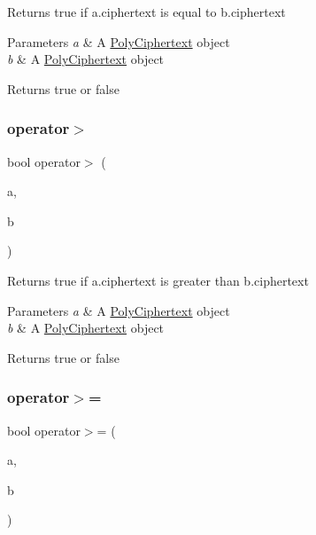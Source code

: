 Returns true if {\ttfamily a.\+ciphertext} is equal to {\ttfamily b.\+ciphertext} 
\begin{DoxyParams}{Parameters}
{\em a} & A {\ttfamily \hyperlink{classPolyCiphertext}{Poly\+Ciphertext}} object \\
\hline
{\em b} & A {\ttfamily \hyperlink{classPolyCiphertext}{Poly\+Ciphertext}} object \\
\hline
\end{DoxyParams}
\begin{DoxyReturn}{Returns}
{\ttfamily true} or {\ttfamily false} 
\end{DoxyReturn}
\mbox{\label{classPolyCiphertext_a2a58b35102feabe6b31bacdd457d7884}} 
\subsubsection{\texorpdfstring{operator$>$}{operator>}}
{\footnotesize\ttfamily bool operator$>$ (\begin{DoxyParamCaption}\item[{const \hyperlink{classPolyCiphertext}{Poly\+Ciphertext} \&}]{a,  }\item[{const \hyperlink{classPolyCiphertext}{Poly\+Ciphertext} \&}]{b }\end{DoxyParamCaption})\hspace{0.3cm}{\ttfamily [friend]}}

Returns true if {\ttfamily a.\+ciphertext} is greater than {\ttfamily b.\+ciphertext} 
\begin{DoxyParams}{Parameters}
{\em a} & A {\ttfamily \hyperlink{classPolyCiphertext}{Poly\+Ciphertext}} object \\
\hline
{\em b} & A {\ttfamily \hyperlink{classPolyCiphertext}{Poly\+Ciphertext}} object \\
\hline
\end{DoxyParams}
\begin{DoxyReturn}{Returns}
{\ttfamily true} or {\ttfamily false} 
\end{DoxyReturn}
\mbox{\label{classPolyCiphertext_ab76ec0162c70ea00a11f921d617d102d}} 
\subsubsection{\texorpdfstring{operator$>$=}{operator>=}}
{\footnotesize\ttfamily bool operator$>$= (\begin{DoxyParamCaption}\item[{const \hyperlink{classPolyCiphertext}{Poly\+Ciphertext} \&}]{a,  }\item[{const \hyperlink{classPolyCiphertext}{Poly\+Ciphertext} \&}]{b }\end{DoxyParamCaption})\hspace{0.3cm}{\ttfamily [friend]}}

